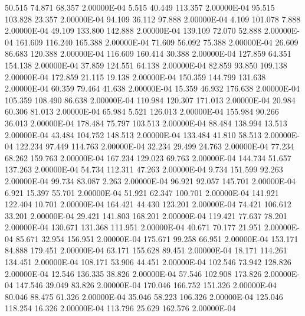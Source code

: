    50.515    74.871    68.357  2.00000E-04
     5.515    40.449   113.357  2.00000E-04
    95.515   103.828    23.357  2.00000E-04
    94.109    36.112    97.888  2.00000E-04
     4.109   101.078     7.888  2.00000E-04
    49.109   133.800   142.888  2.00000E-04
   139.109    72.070    52.888  2.00000E-04
   161.609   116.240   165.388  2.00000E-04
    71.609    56.092    75.388  2.00000E-04
    26.609    86.683   120.388  2.00000E-04
   116.609   160.414    30.388  2.00000E-04
   127.859    64.351   154.138  2.00000E-04
    37.859   124.551    64.138  2.00000E-04
    82.859    93.850   109.138  2.00000E-04
   172.859    21.115    19.138  2.00000E-04
   150.359   144.799   131.638  2.00000E-04
    60.359    79.464    41.638  2.00000E-04
    15.359    46.932   176.638  2.00000E-04
   105.359   108.490    86.638  2.00000E-04
   110.984   120.307   171.013  2.00000E-04
    20.984    60.306    81.013  2.00000E-04
    65.984     5.521   126.013  2.00000E-04
   155.984    90.266    36.013  2.00000E-04
   178.484    75.797   103.513  2.00000E-04
    88.484   138.994    13.513  2.00000E-04
    43.484   104.752   148.513  2.00000E-04
   133.484    41.810    58.513  2.00000E-04
   122.234    97.449   114.763  2.00000E-04
    32.234    29.499    24.763  2.00000E-04
    77.234    68.262   159.763  2.00000E-04
   167.234   129.023    69.763  2.00000E-04
   144.734    51.657   137.263  2.00000E-04
    54.734   112.311    47.263  2.00000E-04
     9.734   151.599    92.263  2.00000E-04
    99.734    83.087     2.263  2.00000E-04
    96.921    92.057   145.701  2.00000E-04
     6.921    15.397    55.701  2.00000E-04
    51.921    62.347   100.701  2.00000E-04
   141.921   122.404    10.701  2.00000E-04
   164.421    44.430   123.201  2.00000E-04
    74.421   106.612    33.201  2.00000E-04
    29.421   141.803   168.201  2.00000E-04
   119.421    77.637    78.201  2.00000E-04
   130.671   131.368   111.951  2.00000E-04
    40.671    70.177    21.951  2.00000E-04
    85.671    32.954   156.951  2.00000E-04
   175.671    99.258    66.951  2.00000E-04
   153.171    84.888   179.451  2.00000E-04
    63.171   155.628    89.451  2.00000E-04
    18.171   114.261   134.451  2.00000E-04
   108.171    53.906    44.451  2.00000E-04
   102.546    73.942   128.826  2.00000E-04
    12.546   136.335    38.826  2.00000E-04
    57.546   102.908   173.826  2.00000E-04
   147.546    39.049    83.826  2.00000E-04
   170.046   166.752   151.326  2.00000E-04
    80.046    88.475    61.326  2.00000E-04
    35.046    58.223   106.326  2.00000E-04
   125.046   118.254    16.326  2.00000E-04
   113.796    25.629   162.576  2.00000E-04
